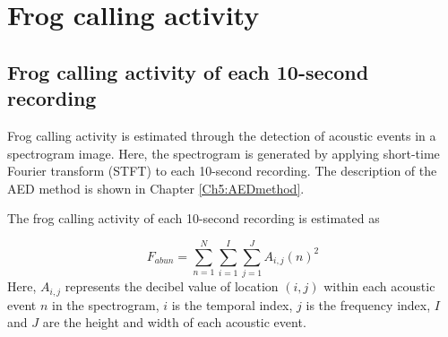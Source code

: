 \section{Frog calling activity}

\subsection{Frog calling activity of each 10-second recording}
Frog calling activity is estimated through the detection of acoustic events in a spectrogram image. Here, the spectrogram is generated by applying short-time Fourier transform (STFT) to each 10-second recording. The description of the AED method is shown in Chapter \ref{Ch5:AEDmethod}.



The frog calling activity of each 10-second recording is estimated as 

\begin{equation}
F_{abun} = \sum_{n=1}^{N}\sum_{i=1}^{I}\sum_{j=1}^{J} A_{i,j}(n)^2
\end{equation}
Here, $A_{i,j}$ represents the decibel value of location $(i,j)$ within each acoustic event $n$ in the spectrogram, $i$ is the temporal index, $j$ is the frequency index, $I$ and $J$ are the height and width of each acoustic event.

